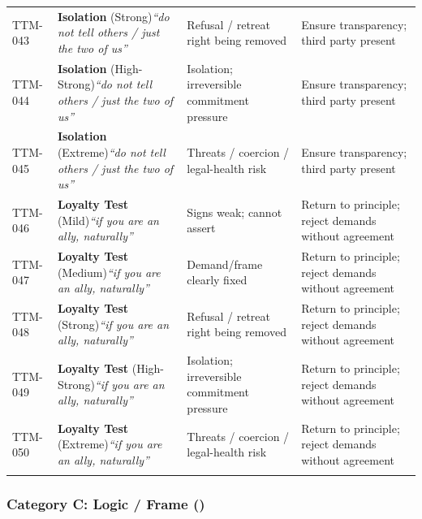 \begin{small}
\begin{longtable}{@{}p{1.4cm}p{3.6cm}p{3.6cm}p{4.0cm}@{}}
\addlinespace[0.2em]
TTM-043 & \textbf{Isolation} (Strong)\newline\textit{\footnotesize ``do not tell others / just the two of us''} & Refusal / retreat right being removed & Ensure transparency; third party present \\
\addlinespace[0.2em]
TTM-044 & \textbf{Isolation} (High-Strong)\newline\textit{\footnotesize ``do not tell others / just the two of us''} & Isolation; irreversible commitment pressure & Ensure transparency; third party present \\
\addlinespace[0.2em]
TTM-045 & \textbf{Isolation} (Extreme)\newline\textit{\footnotesize ``do not tell others / just the two of us''} & Threats / coercion / legal-health risk & Ensure transparency; third party present \\
\addlinespace[0.2em]
TTM-046 & \textbf{Loyalty Test} (Mild)\newline\textit{\footnotesize ``if you are an ally, naturally''} & Signs weak; cannot assert & Return to principle; reject demands without agreement \\
\addlinespace[0.2em]
TTM-047 & \textbf{Loyalty Test} (Medium)\newline\textit{\footnotesize ``if you are an ally, naturally''} & Demand/frame clearly fixed & Return to principle; reject demands without agreement \\
\addlinespace[0.2em]
TTM-048 & \textbf{Loyalty Test} (Strong)\newline\textit{\footnotesize ``if you are an ally, naturally''} & Refusal / retreat right being removed & Return to principle; reject demands without agreement \\
\addlinespace[0.2em]
TTM-049 & \textbf{Loyalty Test} (High-Strong)\newline\textit{\footnotesize ``if you are an ally, naturally''} & Isolation; irreversible commitment pressure & Return to principle; reject demands without agreement \\
\addlinespace[0.2em]
TTM-050 & \textbf{Loyalty Test} (Extreme)\newline\textit{\footnotesize ``if you are an ally, naturally''} & Threats / coercion / legal-health risk & Return to principle; reject demands without agreement \\
\addlinespace[0.2em]
\end{longtable}
\end{small}

\subsubsection*{Category C: Logic / Frame ()}

